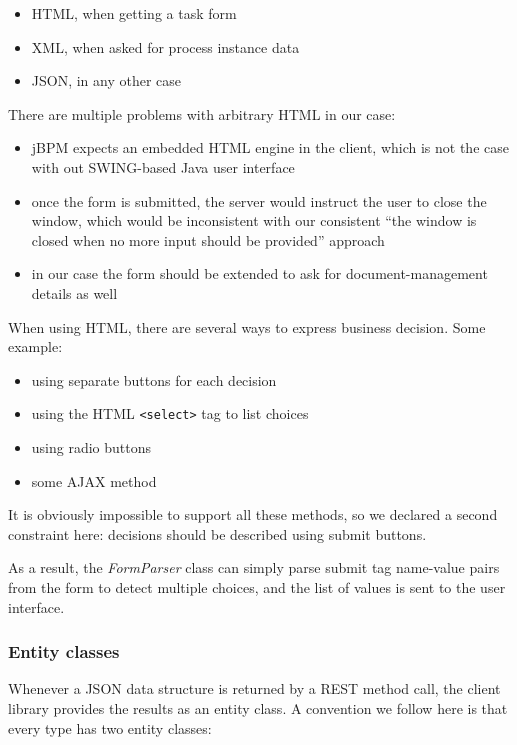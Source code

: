 \begin{itemize}
\item HTML, when getting a task form
\item XML, when asked for process instance data
\item JSON, in any other case
\end{itemize}

There are multiple problems with arbitrary HTML in our case:

\begin{itemize}
\item jBPM expects an embedded HTML engine in the client, which is not the case with out SWING-based Java user interface
\item once the form is submitted, the server would instruct the user to close
the window, which would be inconsistent with our consistent ``the window is
closed when no more input should be provided'' approach
\item in our case the form should be extended to ask for document-management details as well
\end{itemize}

When using HTML, there are several ways to express business decision. Some example:

\begin{itemize}
\item using separate buttons for each decision
\item using the HTML \texttt{<select>} tag to list choices
\item using radio buttons
\item some AJAX method
\end{itemize}

It is obviously impossible to support all these methods, so we declared a
second constraint here: decisions should be described using submit buttons.

As a result, the \emph{FormParser} class can simply parse submit tag name-value
pairs from the form to detect multiple choices, and the list of values is sent
to the user interface.

\subsubsection*{Entity classes}

Whenever a JSON data structure is returned by a REST method call, the client
library provides the results as an entity class. A convention we follow here is that every type has two entity classes:

